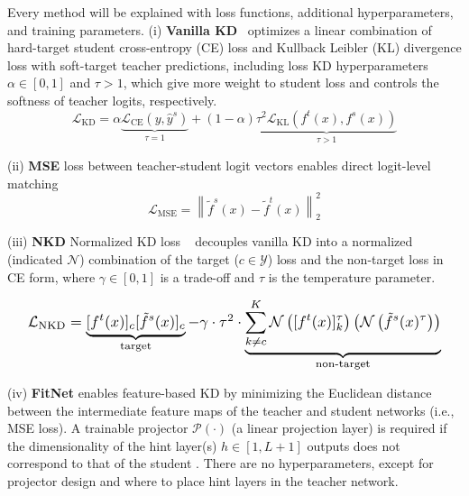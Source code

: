 \documentclass[runningheads]{llncs}
\begin{document}
Every method will be explained with loss functions, additional hyperparameters, and training parameters.
\noindent(i) \textbf{Vanilla KD}~\cite{hinton2015distilling} optimizes a linear combination of hard-target student cross-entropy (CE) loss and Kullback Leibler (KL) divergence loss with soft-target teacher predictions, including loss KD hyperparameters $\alpha \in [0,1]$ and $\tau > 1$, which give more weight to student loss and controls the softness of teacher logits, respectively. %
\begin{equation*}
    \mathcal{L}_{\mathrm{KD}}= \alpha \underbrace{\mathcal{L}_{\mathrm{CE}}\left(y, \hat{y}^s\right)}_{\tau=1}+(1-\alpha)\underbrace{\tau^2 \mathcal{L}_{\mathrm{KL}}\left(f^t(x), f^s(x)\right)}_{\tau>1}
\end{equation*}


\noindent(ii) \textbf{MSE} loss between teacher-student logit vectors enables direct logit-level matching \cite{kim2021comparing}
\begin{equation*}
    \mathcal{L}_{\mathrm{MSE}}=\left\|\tilde{f}^{s}\left(x\right)-\tilde{f}^{t}\left(x\right)\right\|_{2}^{2}
\end{equation*}

\noindent(iii) \textbf{NKD} Normalized KD loss ~\cite{yang2023knowledge} decouples vanilla KD into a normalized (indicated $\mathcal{N}$) combination of the target ($c \in \mathcal{Y}$) loss and the non-target loss in CE form, %
where $\gamma \in [0,1]$ is a trade-off and $\tau$ is the temperature parameter.

\begin{equation*}
    \resizebox{.95\columnwidth}{!}{$
        \mathcal{L}_{\mathrm{NKD}}= \underbrace{[f^t(x)]_c [\tilde{f}^s(x)]_c}_{\text{target}}-\gamma \cdot \tau^2 \cdot \underbrace{\sum_{k \neq c}^K \mathcal{N}\left([f^t(x)]_k^\tau\right) \left(\mathcal{N}\left(\tilde{f}^s(x)^\tau\right)\right)}_{\text{non-target}}
    $}
\end{equation*}

\noindent(iv) \textbf{FitNet} \cite{romero2014fitnets} enables feature-based KD by minimizing the Euclidean distance between the intermediate feature maps of the teacher and student networks (i.e., MSE loss). A trainable projector $\mathcal{P}(\cdot)$ (\eg a linear projection layer) is required if the dimensionality of the hint layer(s) $h \in [1, L+1]$ outputs does not correspond to that of the student
. There are no hyperparameters, except for projector design and where to place hint layers in the teacher network.
\end{document}
